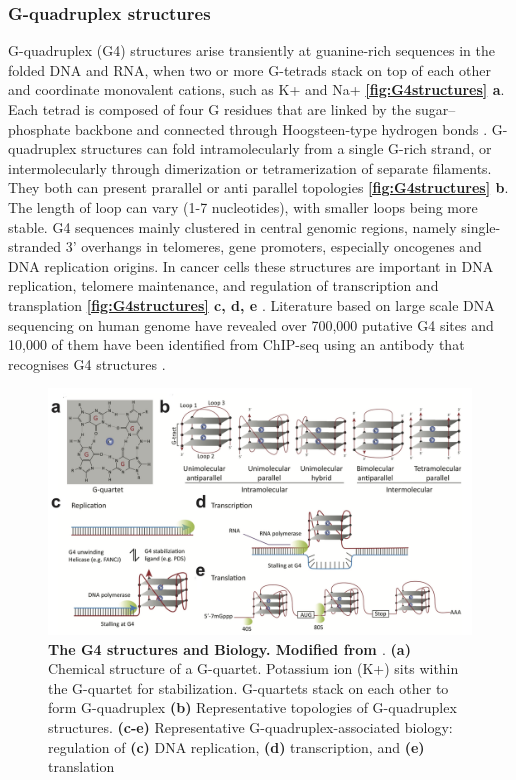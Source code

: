 \subsubsection{G-quadruplex structures}
G-quadruplex (G4) structures arise transiently at guanine-rich sequences in the folded DNA and RNA, when two or more G-tetrads stack on top of each other and coordinate monovalent cations, such as K+ and Na+ \cite{sen1990sodium} \textbf{\autoref{fig:G4structures} a}. Each tetrad is composed of four G residues that are linked by the sugar–phosphate backbone and connected through Hoogsteen-type hydrogen bonds \cite{kwok2017g}. G-quadruplex structures can fold intramolecularly from a single G-rich strand, or intermolecularly through dimerization or tetramerization of separate filaments. They both can present prarallel or anti parallel topologies \textbf{\autoref{fig:G4structures} b}. The length of loop can vary (1-7 nucleotides), with smaller loops being more stable\cite{huppert2010structure}.
G4 sequences mainly clustered in central genomic regions, namely single-stranded 3’ overhangs in telomeres, gene promoters, especially oncogenes and DNA replication origins. In cancer cells these structures are important in DNA replication, telomere maintenance, and regulation of transcription and transplation \textbf{\autoref{fig:G4structures} c, d, e} \cite{rhodes2015g, maizels2013g4}. Literature based on large scale DNA sequencing on human genome have revealed over 700,000 putative G4 sites and 10,000 of them have been identified from ChIP-seq using an antibody that recognises G4 structures \cite{siddiqui2002direct, granotier2005preferential, chambers2015high, hansel2016g}.

 \begin{figure}
\centering
\includegraphics[width=\textwidth]{Figures/G4structures.png}
	\caption[The G4 structures and their biology]
	{\small
	    \textbf{The G4 structures and Biology. Modified from \cite{kwok2017g}}.
	   \textbf{(a)} Chemical structure of a G-quartet. Potassium ion (K+) sits within the G-quartet for stabilization. G-quartets stack on each other to form G-quadruplex \textbf{(b)} Representative topologies of G-quadruplex structures. \textbf{(c-e)} Representative G-quadruplex-associated biology: regulation of \textbf{(c)} DNA replication, \textbf{(d)} transcription, and \textbf{(e)} translation
	}
	\label{fig:G4structures}
\end{figure}
 

